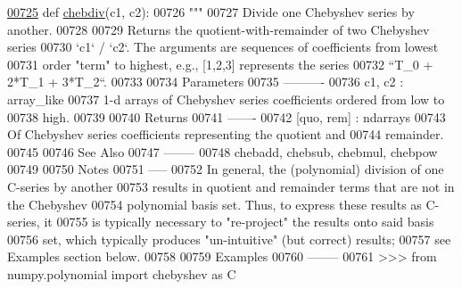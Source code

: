\begin{DoxyCode}
\hypertarget{namespacepyneb_1_1utils_1_1chebyshev_l00725}{}\hyperlink{namespacepyneb_1_1utils_1_1chebyshev_aa84df28815f29342a7cdce9b95470f02}{00725} \textcolor{keyword}{def }\hyperlink{namespacepyneb_1_1utils_1_1chebyshev_aa84df28815f29342a7cdce9b95470f02}{chebdiv}(c1, c2):
00726     \textcolor{stringliteral}{"""}
00727 \textcolor{stringliteral}{    Divide one Chebyshev series by another.}
00728 \textcolor{stringliteral}{}
00729 \textcolor{stringliteral}{    Returns the quotient-with-remainder of two Chebyshev series}
00730 \textcolor{stringliteral}{    `c1` / `c2`.  The arguments are sequences of coefficients from lowest}
00731 \textcolor{stringliteral}{    order "term" to highest, e.g., [1,2,3] represents the series}
00732 \textcolor{stringliteral}{    ``T\_0 + 2*T\_1 + 3*T\_2``.}
00733 \textcolor{stringliteral}{}
00734 \textcolor{stringliteral}{    Parameters}
00735 \textcolor{stringliteral}{    ----------}
00736 \textcolor{stringliteral}{    c1, c2 : array\_like}
00737 \textcolor{stringliteral}{        1-d arrays of Chebyshev series coefficients ordered from low to}
00738 \textcolor{stringliteral}{        high.}
00739 \textcolor{stringliteral}{}
00740 \textcolor{stringliteral}{    Returns}
00741 \textcolor{stringliteral}{    -------}
00742 \textcolor{stringliteral}{    [quo, rem] : ndarrays}
00743 \textcolor{stringliteral}{        Of Chebyshev series coefficients representing the quotient and}
00744 \textcolor{stringliteral}{        remainder.}
00745 \textcolor{stringliteral}{}
00746 \textcolor{stringliteral}{    See Also}
00747 \textcolor{stringliteral}{    --------}
00748 \textcolor{stringliteral}{    chebadd, chebsub, chebmul, chebpow}
00749 \textcolor{stringliteral}{}
00750 \textcolor{stringliteral}{    Notes}
00751 \textcolor{stringliteral}{    -----}
00752 \textcolor{stringliteral}{    In general, the (polynomial) division of one C-series by another}
00753 \textcolor{stringliteral}{    results in quotient and remainder terms that are not in the Chebyshev}
00754 \textcolor{stringliteral}{    polynomial basis set.  Thus, to express these results as C-series, it}
00755 \textcolor{stringliteral}{    is typically necessary to "re-project" the results onto said basis}
00756 \textcolor{stringliteral}{    set, which typically produces "un-intuitive" (but correct) results;}
00757 \textcolor{stringliteral}{    see Examples section below.}
00758 \textcolor{stringliteral}{}
00759 \textcolor{stringliteral}{    Examples}
00760 \textcolor{stringliteral}{    --------}
00761 \textcolor{stringliteral}{    >>> from numpy.polynomial import chebyshev as C}

\end{DoxyCode}
